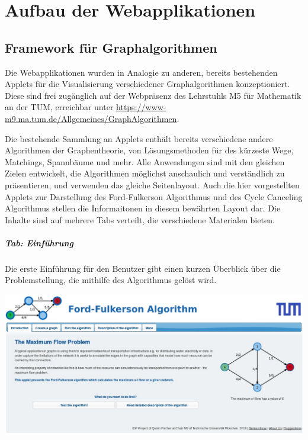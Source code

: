 \chapter{Aufbau der Webapplikationen}

\section{Framework für Graphalgorithmen}

Die Webapplikationen wurden in Analogie zu anderen, bereits bestehenden Applets für die Visualisierung verschiedener Graphalgorithmen konzeptioniert. Diese sind frei zugänglich auf der Webpräsenz des Lehrstuhls M5 für Mathematik an der TUM, erreichbar unter \href{https://www-m9.ma.tum.de/Allgemeines/GraphAlgorithmen}{https://www-m9.ma.tum.de/Allgemeines/GraphAlgorithmen}. 

Die bestehende Sammlung an Applets enthält bereits verschiedene andere Algorithmen der Graphentheorie, von Lösungsmethoden für des kürzeste Wege, Matchings, Spannbäume und mehr. Alle Anwendungen sind mit den gleichen Zielen entwickelt, die Algorithmen möglichst anschaulich und verständlich zu präsentieren, und verwenden das gleiche Seitenlayout. Auch die hier vorgestellten Applets zur Darstellung des Ford-Fulkerson Algorithmus und des Cycle Canceling Algorithmus stellen die Informaitonen in diesem bewährten Layout dar. Die Inhalte sind auf mehrere Tabs verteilt, die verschiedene Materialen bieten.

\paragraph{Tab: Einführung}

Die erste Einführung für den Benutzer gibt einen kurzen Überblick über die Problemstellung, die mithilfe des Algorithmus gelöst wird.
\begin{center}
\begin{minipage}[t]{0.60\textwidth}
    \includegraphics[width=\textwidth]{img/layout-1.jpg}
\end{minipage}
\end{center}
\vspace{1cm}

